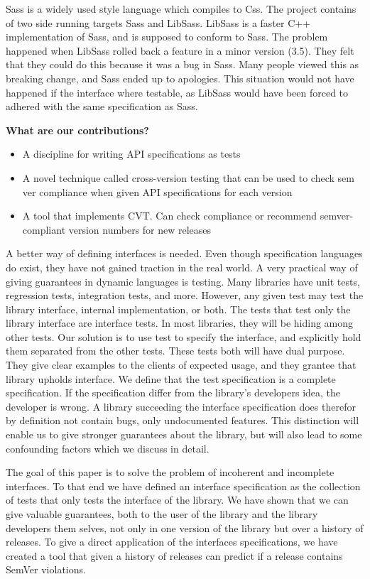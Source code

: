 Sass is a widely used style language which compiles to Css. The project
contains of two side running targets Sass and LibSass. LibSass is a 
faster C++ implementation of Sass, and is supposed to conform to Sass. The
problem happened when LibSass rolled back a feature in a minor version (3.5). 
They felt that they could do this because it was a bug in Sass. Many people 
viewed this as breaking change, and Sass ended up to apologies. This situation
would not have happened if the interface where testable, as LibSass would have
been forced to adhered with the same specification as Sass\cite{libsass}. 
%


{\bf What are our contributions?}
\begin{itemize}
\item A discipline for writing API specifications as tests
\item A novel technique called cross-version testing that can be used
  to check sem ver compliance when given API specifications for each
  version
\item A tool that implements CVT. Can check compliance or recommend
  semver-compliant version numbers for new releases
\end{itemize}

A better way of defining interfaces is needed. Even though specification
languages do exist, they have not gained traction in the real world. A very
practical way of giving guarantees in dynamic languages is testing.  Many
libraries have unit tests, regression tests, integration tests, and more.
However, any given test may test the library interface, internal
implementation, or both.  The tests that test only the library interface are
interface tests. In most libraries, they will be hiding among other tests.  Our
solution is to use test to specify the interface, and explicitly hold them
separated from the other tests. These tests both will have dual purpose. They
give clear examples to the clients of expected usage, and they grantee that
library upholds interface. We define that the test specification is a complete
specification. If the specification differ from the library's developers idea,
the developer is wrong.  A library succeeding the interface specification does
therefor by definition not contain bugs, only undocumented features. This
distinction will enable us to give stronger guarantees about the library, but
will also lead to some confounding factors which we discuss in detail.

The goal of this paper is to solve the problem of incoherent and
incomplete interfaces. To that end we have defined an interface specification
as the collection of tests that only tests the interface of the library. We have
shown that we can give valuable guarantees, both to the user of the library and
the library developers them selves, not only in one version of the library but 
over a history of releases. To give a direct application of the interfaces 
specifications, we have created a tool that given a history of releases can
predict if a release contains SemVer violations. 


